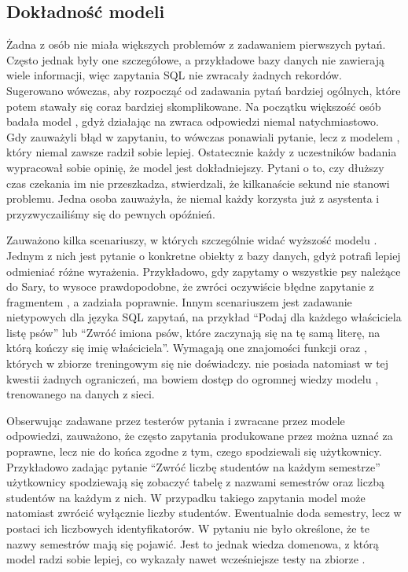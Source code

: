 \subsection{Dokładność modeli}
Żadna z osób nie miała większych problemów z zadawaniem pierwszych pytań. Często jednak były one szczegółowe, a przykładowe bazy danych nie zawierają wiele informacji, więc zapytania SQL nie zwracały żadnych rekordów. Sugerowano wówczas, aby rozpocząć od zadawania pytań bardziej ogólnych, które potem stawały się coraz bardziej skomplikowane. Na początku większość osób badała model , gdyż działając na  zwraca odpowiedzi niemal natychmiastowo. Gdy zauważyli błąd w zapytaniu, to wówczas ponawiali pytanie, lecz z modelem , który niemal zawsze radził sobie lepiej. Ostatecznie każdy z uczestników badania wypracował sobie opinię, że model  jest dokładniejszy. Pytani o to, czy dłuższy czas czekania im nie przeszkadza, stwierdzali, że kilkanaście sekund nie stanowi problemu. Jedna osoba zauważyła, że niemal każdy korzysta już z asystenta   i przyzwyczailiśmy się do pewnych opóźnień.

Zauważono kilka scenariuszy, w których szczególnie widać wyższość modelu . Jednym z nich jest pytanie o konkretne obiekty z bazy danych, gdyż  potrafi lepiej odmieniać różne wyrażenia. Przykładowo, gdy zapytamy o wszystkie psy należące do Sary, to wysoce prawdopodobne, że  zwróci oczywiście błędne zapytanie z fragmentem , a  zadziała poprawnie. Innym scenariuszem jest zadawanie nietypowych dla języka SQL zapytań, na przykład \enquote{Podaj dla każdego właściciela listę psów} lub \enquote{Zwróć imiona psów, które zaczynają się na tę samą literę, na którą kończy się imię właściciela}. Wymagają one znajomości funkcji \mbox{} oraz , których w zbiorze treningowym  się nie doświadczy.  nie posiada natomiast w tej kwestii żadnych ograniczeń, ma bowiem dostęp do ogromnej wiedzy modelu , trenowanego na danych z sieci.

Obserwując zadawane przez testerów pytania i zwracane przez modele odpowiedzi, zauważono, że często zapytania produkowane przez  można uznać za poprawne, lecz nie do końca zgodne z tym, czego spodziewali się użytkownicy. Przykładowo zadając pytanie \enquote{Zwróć liczbę studentów na każdym semestrze} użytkownicy spodziewają się zobaczyć tabelę z nazwami semestrów oraz liczbą studentów na każdym z nich. W przypadku takiego zapytania model może natomiast zwrócić wyłącznie liczby studentów. Ewentualnie doda semestry, lecz w postaci ich liczbowych identyfikatorów. W pytaniu nie było określone, że te nazwy semestrów mają się pojawić. Jest to jednak wiedza domenowa, z którą model  radzi sobie lepiej, co wykazały nawet wcześniejsze testy na zbiorze .

